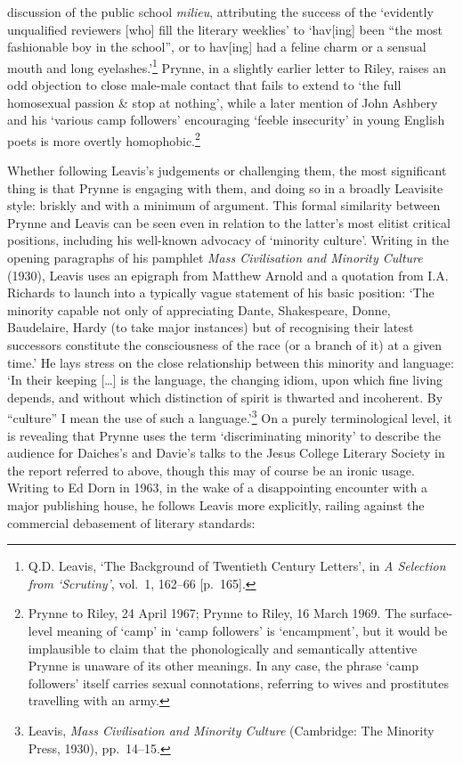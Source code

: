 \documentclass[]{article}
\begin{document}
discussion of the public school \emph{milieu}, attributing the success
of the `evidently unqualified reviewers {[}who{]} fill the literary
weeklies' to `hav{[}ing{]} been ``the most fashionable boy in the
school'', or to hav{[}ing{]} had a feline charm or a sensual mouth and
long eyelashes.'\footnote{Q.D. Leavis, `The Background of Twentieth
  Century Letters', in \emph{A Selection from `Scrutiny'}, vol.~1,
  162--66 {[}p.~165{]}.} Prynne, in a slightly earlier letter to Riley,
raises an odd objection to close male-male contact that fails to extend
to `the full homosexual passion \& stop at nothing', while a later
mention of John Ashbery and his `various camp followers' encouraging
`feeble insecurity' in young English poets is more overtly
homophobic.\footnote{Prynne to Riley, 24 April 1967; Prynne to Riley, 16
  March 1969. The surface-level meaning of `camp' in `camp followers' is
  `encampment', but it would be implausible to claim that the
  phonologically and semantically attentive Prynne is unaware of its
  other meanings. In any case, the phrase `camp followers' itself
  carries sexual connotations, referring to wives and prostitutes
  travelling with an army.}

Whether following Leavis's judgements or challenging them, the most
significant thing is that Prynne is engaging with them, and doing so in
a broadly Leavisite style: briskly and with a minimum of argument. This
formal similarity between Prynne and Leavis can be seen even in relation
to the latter's most elitist critical positions, including his
well-known advocacy of `minority culture'. Writing in the opening
paragraphs of his pamphlet \emph{Mass Civilisation and Minority Culture}
(1930), Leavis uses an epigraph from Matthew Arnold and a quotation from
I.A. Richards to launch into a typically vague statement of his basic
position: `The minority capable not only of appreciating Dante,
Shakespeare, Donne, Baudelaire, Hardy (to take major instances) but of
recognising their latest successors constitute the consciousness of the
race (or a branch of it) at a given time.' He lays stress on the close
relationship between this minority and language: `In their keeping
{[}\ldots{}{]} is the language, the changing idiom, upon which fine
living depends, and without which distinction of spirit is thwarted and
incoherent. By ``culture'' I mean the use of such a language.'\footnote{Leavis,
  \emph{Mass Civilisation and Minority Culture} (Cambridge: The Minority
  Press, 1930), pp.~14--15.} On a purely terminological level, it is
revealing that Prynne uses the term `discriminating minority' to
describe the audience for Daiches's and Davie's talks to the Jesus
College Literary Society in the report referred to above, though this
may of course be an ironic usage. Writing to Ed Dorn in 1963, in the
wake of a disappointing encounter with a major publishing house, he
follows Leavis more explicitly, railing against the commercial
debasement of literary standards:
\end{document}
